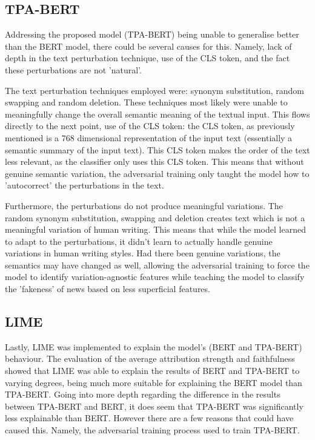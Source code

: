 \documentclass[stu,12pt,floatsintext,donotrepeattitle]{apa7}
\begin{document}
\subsection{TPA-BERT}
Addressing the proposed model (TPA-BERT) being unable to generalise better than the BERT model, there could be several causes for this. Namely, lack of depth in the text perturbation technique, use of the CLS token, and the fact these perturbations are not 'natural'. 

The text perturbation techniques employed were: synonym substitution, random swapping and random deletion. These techniques most likely were unable to meaningfully change the overall semantic meaning of the textual input. This flows directly to the next point, use of the CLS token: the CLS token, as previously mentioned is a 768 dimensional representation of the input text (essentially a semantic summary of the input text). This CLS token makes the order of the text less relevant, as the classifier only uses this CLS token. This means that without genuine semantic variation, the adversarial training only taught the model how to 'autocorrect' the perturbations in the text.

Furthermore, the perturbations do not produce meaningful variations. The random synonym substitution, swapping and deletion creates text which is not a meaningful variation of human writing. This means that while the model learned to adapt to the perturbations, it didn't learn to actually handle genuine variations in human writing styles. Had there been genuine variations, the semantics may have changed as well, allowing the adversarial training to force the model to identify variation-agnostic features while teaching the model to classify the 'fakeness' of news based on less superficial features.

\subsection{LIME}
Lastly, LIME was implemented to explain the model's (BERT and TPA-BERT) behaviour. The evaluation of the average attribution strength and faithfulness showed that LIME was able to explain the results of BERT and TPA-BERT to varying degrees, being much more suitable for explaining the BERT model than TPA-BERT. Going into more depth regarding the difference in the results between TPA-BERT and BERT, it does seem that TPA-BERT was significantly less explainable than BERT. However there are a few reasons that could have caused this. Namely, the adversarial training process used to train TPA-BERT.
\end{document}
